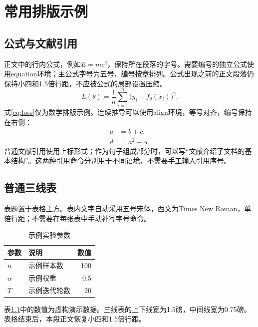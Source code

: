 \chapter{常用排版示例}
\section{公式与文献引用}
正文中的行内公式，例如$E=mc^2$，保持所在段落的字号。需要编号的独立公式使用equation环境；主公式字号为五号，编号按章排列。公式出现之前的正文段落仍保持小四和1.5倍行距，不应被公式的局部设置压缩。
\begin{equation}\label{eq:loss}
  L(\theta)=\frac{1}{n}\sum_{i=1}^{n}\bigl(y_i-f_{\theta}(x_i)\bigr)^2.
\end{equation}
式\eqref{eq:loss}仅为数学排版示例。连续推导可以使用align环境，等号对齐，编号保持在右侧：
\begin{align}
  a&=b+c,\\
  d&=a^2+\alpha.
\end{align}
普通文献引用使用上标形式\cite{knuth1984}；作为句子组成部分时，可以写“文献介绍了文档的基本结构”。这两种引用命令分别用于不同语境，不需要手工输入引用序号。
\section{普通三线表}
表题置于表格上方。表内文字自动采用五号宋体，西文为Times New Roman，单倍行距；不需要在每张表中手动补写字号命令。
\begin{table}[htbp]
  \caption{示例实验参数}\label{tab:parameters}
  \centering
  \begin{tabularx}{.85\textwidth}{lXr}
    \toprule 参数 & 说明 & 数值\\\midrule
    $n$ & 示例样本数 & 100\\
    $\alpha$ & 示例权重 & 0.5\\
    $T$ & 示例迭代轮数 & 20\\\bottomrule
  \end{tabularx}
\end{table}
表\ref{tab:parameters}中的数值为虚构演示数据。三线表的上下线宽为1.5磅，中间线宽为0.75磅。表格结束后，本段正文恢复小四和1.5倍行距。
